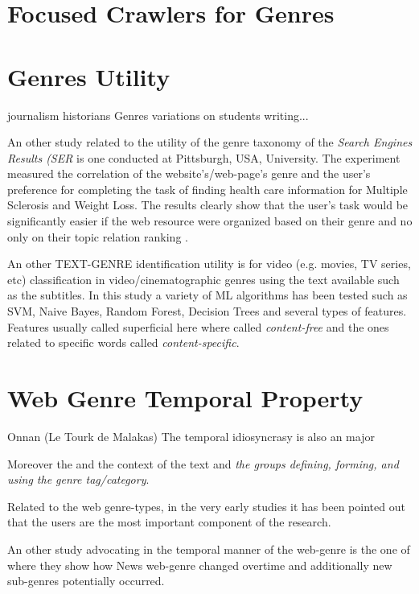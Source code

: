 \section{Focused Crawlers for Genres}\label{chap:relevant_work:sec:intro}

\section{Genres Utility}\label{chap:relevant_work:sec:intro}
journalism historians
Genres variations on students writing...

An other study related to the utility of the genre taxonomy of the \textit{Search Engines Results (SER} is one conducted at Pittsburgh, USA, University.  The experiment measured the correlation of the website's/web-page's genre and the user's preference for completing the task of finding health care information for Multiple Sclerosis and Weight Loss. The results clearly show that the user's task would be significantly easier if the web resource were organized based on their genre and no only on their topic relation ranking \parencite{chi2018sources}.

An other TEXT-GENRE identification utility is for video (e.g. movies, TV series, etc) classification in video/cinematographic genres using the text available such as the subtitles. In this study a variety of ML algorithms has been tested such as SVM, Naive Bayes, Random Forest, Decision Trees and several types of features. Features usually called superficial here where called \textit{content-free} and the ones related to specific words called \textit{content-specific}\parencite{lee2017text}.

\section{Web Genre Temporal Property}\label{chap:relevant_work:sec:intro}
Onnan (Le Tourk de Malakas)
The temporal idiosyncrasy is also an major  

Moreover the  and the context of the text and \textit{the groups defining, forming, and using the genre tag/category}.

Related to the web genre-types, in the very early studies it has been pointed out that the users are the most important component of the research. 

An other study advocating in the temporal manner of the web-genre is the one of  \parencite{caple2017genre} where they show how News web-genre changed overtime and additionally new sub-genres potentially occurred.



